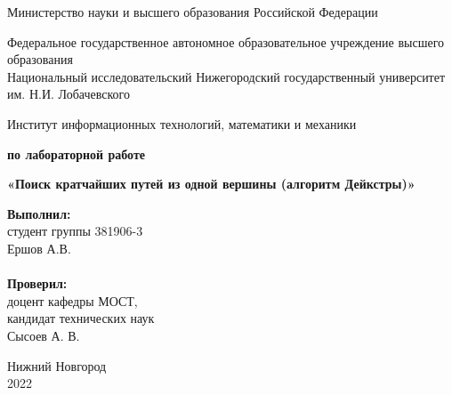 \documentclass{report}
\begin{document}
\begin{titlepage}

\begin{center}
Министерство науки и высшего образования Российской Федерации
\end{center}

\begin{center}
Федеральное государственное автономное образовательное учреждение высшего образования \\
Национальный исследовательский Нижегородский государственный университет им. Н.И. Лобачевского
\end{center}

\begin{center}
Институт информационных технологий, математики и механики
\end{center}

\vspace{4em}

\begin{center}
\textbf{ по лабораторной работе} \\
\end{center}
\begin{center}
\textbf{\Large«Поиск кратчайших путей из одной вершины (алгоритм Дейкстры)»} \\
\end{center}

\vspace{4em}

\newbox{\lbox}
\newlength{\maxl}
\setlength{\maxl}{\wd\lbox}
\hfill\parbox{7cm}{
\hspace*{5cm}\hspace*{-5cm}\textbf{Выполнил:} \\ студент группы 381906-3 \\ Ершов А.В.\\
\\
\hspace*{5cm}\hspace*{-5cm}\textbf{Проверил:}\\ доцент кафедры МОСТ, \\ кандидат технических наук \\ Сысоев А. В.\\
}
\vspace{\fill}

\begin{center} Нижний Новгород \\ 2022 \end{center}

\end{titlepage}
\end{document}
